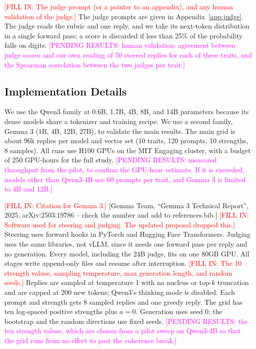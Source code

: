 \documentclass[11pt]{article}
\newcommand{\fillin}[1]{\textcolor{red}{[FILL IN: #1]}}
\newcommand{\upd}[1]{{\color{updgreen}#1}}
\newcommand{\pending}[1]{\textcolor{magenta}{[PENDING RESULTS: #1]}}
\begin{document}
\fillin{The judge prompt (or a pointer to an appendix), and any human validation of
the judge.}
\upd{The judge prompts are given in Appendix~\ref{app:judge}. The judge reads the
rubric and one reply, and we take its next-token distribution in a single forward
pass; a score is discarded if less than 25\% of the probability falls on digits.}
\pending{human validation: agreement between judge scores and our own reading of
50 steered replies for each of three traits, and the Spearman correlation between
the two judges per trait.}

\subsection{Implementation Details}
We \upd{use} the Qwen3 family \cite{yang2025qwen3} at 0.6B, 1.7B, 4B, 8B, and 14B
parameters because its dense models share a tokenizer and training recipe. We \upd{use}
a second family, Gemma 3 (1B, 4B, 12B, 27B), to validate the main results. The main
grid is about 96k replies per model and vector set (10 traits, 120 prompts, 10
strengths, 8 samples). \upd{All runs use H100 GPUs on the MIT Engaging cluster, with a budget of 250
GPU-hours for the full study.}
\pending{measured throughput from the pilot, to confirm the GPU-hour estimate. If
it is exceeded, models other than Qwen3-4B use 60 prompts per trait, and Gemma 3
is limited to 4B and 12B.}

\fillin{Citation for Gemma 3.}
\upd{[Gemma Team, ``Gemma 3 Technical Report'', 2025, arXiv:2503.19786 -- check the
number and add to references.bib.]}
\fillin{Software used for steering and judging. The updated proposal dropped this.}
\upd{Steering uses forward hooks in PyTorch and Hugging Face Transformers. Judging
uses the same libraries, not vLLM, since it needs one forward pass per reply and
no generation. Every model, including the 24B judge, fits on one 80GB GPU. All
stages write append-only files and resume after interruption.}
\fillin{The 10 strength values, sampling temperature, max generation length, and
random seeds.}
\upd{Replies are sampled at temperature 1 with no nucleus or top-$k$ truncation and
are capped at 200 new tokens; Qwen3's thinking mode is disabled. Each prompt and
strength gets 8 sampled replies and one greedy reply. The grid has ten log-spaced
positive strengths plus $a=0$. Generation uses seed 0; the bootstrap and the
random directions use fixed seeds.} \pending{the ten strength values, which are
chosen from a pilot sweep on Qwen3-4B so that the grid runs from no effect to
past the coherence break.}
\end{document}

